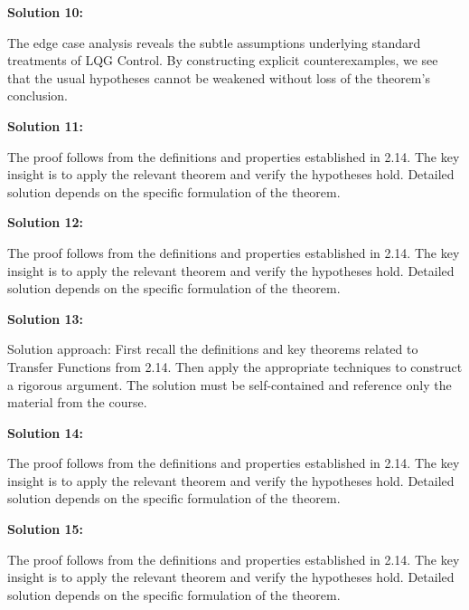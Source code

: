 \documentclass[12pt,a4paper]{exam}
\begin{document}
\vspace{0.5cm}

\textbf{Solution 10:}

The edge case analysis reveals the subtle assumptions underlying standard treatments of LQG Control. By constructing explicit counterexamples, we see that the usual hypotheses cannot be weakened without loss of the theorem's conclusion.

\vspace{0.5cm}

\textbf{Solution 11:}

The proof follows from the definitions and properties established in 2.14. The key insight is to apply the relevant theorem and verify the hypotheses hold. Detailed solution depends on the specific formulation of the theorem.

\vspace{0.5cm}

\textbf{Solution 12:}

The proof follows from the definitions and properties established in 2.14. The key insight is to apply the relevant theorem and verify the hypotheses hold. Detailed solution depends on the specific formulation of the theorem.

\vspace{0.5cm}

\textbf{Solution 13:}

Solution approach: First recall the definitions and key theorems related to Transfer Functions from 2.14. Then apply the appropriate techniques to construct a rigorous argument. The solution must be self-contained and reference only the material from the course.

\vspace{0.5cm}

\textbf{Solution 14:}

The proof follows from the definitions and properties established in 2.14. The key insight is to apply the relevant theorem and verify the hypotheses hold. Detailed solution depends on the specific formulation of the theorem.

\vspace{0.5cm}

\textbf{Solution 15:}

The proof follows from the definitions and properties established in 2.14. The key insight is to apply the relevant theorem and verify the hypotheses hold. Detailed solution depends on the specific formulation of the theorem.
\end{document}

